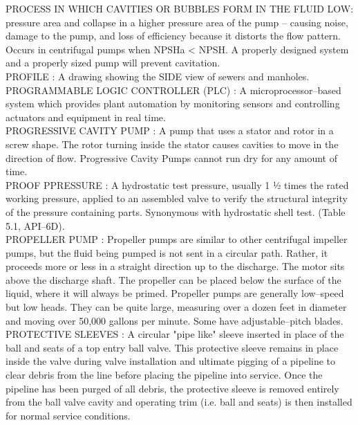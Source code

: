 \vspace{0.15cm}
PROCESS IN WHICH CAVITIES OR BUBBLES FORM IN THE FLUID LOW: pressure area and collapse in a higher pressure area of the pump – causing noise, damage to the pump, and loss of efficiency because it distorts the flow pattern. Occurs in centrifugal pumps when NPSHa < NPSH. A properly designed system and a properly sized pump will prevent cavitation.\\
\vspace{0.15cm}
PROFILE :  A drawing showing the SIDE view of sewers and manholes. \\
\vspace{0.15cm}
PROGRAMMABLE LOGIC CONTROLLER (PLC) :   A microprocessor–based system which provides plant automation by monitoring sensors and controlling actuators and equipment in real time.\\
\vspace{0.15cm}
PROGRESSIVE CAVITY PUMP :   A pump that uses a stator and rotor in a screw shape. The rotor turning inside the stator causes cavities to move in the direction of flow. Progressive Cavity Pumps cannot run dry for any amount of time.\\
\vspace{0.15cm}
PROOF PPRESSURE :   A hydrostatic test pressure, usually 1 ½ times the rated working pressure, applied to an assembled valve to verify the structural integrity of the pressure containing parts. Synonymous with hydrostatic shell test. (Table 5.1, API–6D).\\
\vspace{0.15cm}
PROPELLER PUMP :   Propeller pumps are similar to other centrifugal impeller pumps, but the fluid being pumped is not sent in a circular path. Rather, it proceeds more or less in a straight direction up to the discharge. The motor sits above the discharge shaft. The propeller can be placed below the surface of the liquid, where it will always be primed. Propeller pumps are generally low–speed but low heads. They can be quite large, measuring over a dozen feet in diameter and moving over 50,000 gallons per minute. Some have adjustable–pitch blades.\\
\vspace{0.15cm}
PROTECTIVE SLEEVES :   A circular "pipe like" sleeve inserted in place of the ball and seats of a top entry ball valve. This protective sleeve remains in place inside the valve during valve installation and ultimate pigging of a pipeline to clear debris from the line before placing the pipeline into service. Once the pipeline has been purged of all debris, the protective sleeve is removed entirely from the ball valve cavity and operating trim (i.e. ball and seats) is then installed for normal service conditions.\\
